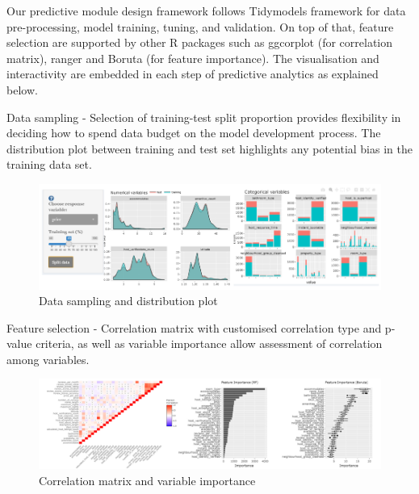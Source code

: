 \documentclass{acm_proc_article-sp}
\begin{document}
Our predictive module design framework follows Tidymodels framework for
data pre-processing, model training, tuning, and validation. On top of
that, feature selection are supported by other R packages such as
ggcorplot (for correlation matrix), ranger and Boruta (for feature
importance). The visualisation and interactivity are embedded in each
step of predictive analytics as explained below.

Data sampling - Selection of training-test split proportion provides
flexibility in deciding how to spend data budget on the model
development process. The distribution plot between training and test set
highlights any potential bias in the training data set.

\begin{figure}[H]

{\centering \includegraphics[width=1\linewidth]{images/datasplit} 

}

\caption{Data sampling and distribution plot}\label{fig:unnamed-chunk-9}
\end{figure}

Feature selection - Correlation matrix with customised correlation type
and p-value criteria, as well as variable importance allow assessment of
correlation among variables.

\begin{figure}[H]

{\centering \includegraphics[width=1\linewidth]{images/featselect} 

}

\caption{Correlation matrix and variable importance}\label{fig:unnamed-chunk-10}
\end{figure}
\end{document}
